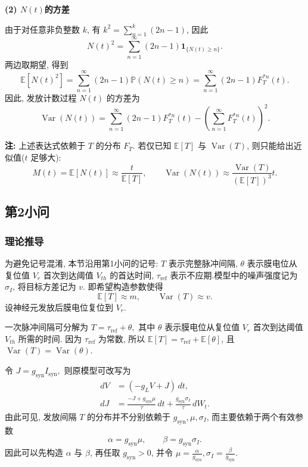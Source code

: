 ﻿\documentclass[UTF8,  zihao=-4]{ctexart}
\begin{document}
\textbf{(2) \(N(t)\)的方差}

由于对任意非负整数 \(k\), 有 \(k^2=\sum_{n=1}^{k}(2n-1)\), 因此
\[
N(t)^2
=
\sum_{n=1}^{\infty}(2n-1)\mathbf{1}_{\{N(t)\geq n\}}.
\]
两边取期望, 得到
\[
\mathbb{E}[N(t)^2]
=
\sum_{n=1}^{\infty}(2n-1)\mathbb{P}(N(t)\geq n)
=
\sum_{n=1}^{\infty}(2n-1)F_T^{*n}(t).
\]
因此, 发放计数过程 \(N(t)\) 的方差为
\[
\operatorname{Var}(N(t))
=
\sum_{n=1}^{\infty}(2n-1)F_T^{*n}(t)
-
\left(
\sum_{n=1}^{\infty}F_T^{*n}(t)
\right)^2.
\]

\textbf{注: }上述表达式依赖于 \(T\) 的分布 \(F_T\). 若仅已知 \(\mathbb{E}[T]\) 与 \(\operatorname{Var}(T)\), 则只能给出近似值(\(t\) 足够大):
\[
M(t)=\mathbb{E}[N(t)]\approx \frac{t}{\mathbb{E}[T]}
, 
\qquad
\operatorname{Var}(N(t))\approx \frac{\operatorname{Var}(T)}{(\mathbb{E}[T])^3}t
.
\]

\subsection{第2小问}
\subsubsection{理论推导}
为避免记号混淆,  本节沿用第1小问的记号: \(T\) 表示完整脉冲间隔,  \(\theta\) 表示膜电位从复位值 \(V_r\) 首次到达阈值 \(V_{th}\) 的首达时间,  \(\tau_{\mathrm{ref}}\) 表示不应期.模型中的噪声强度记为 \(\sigma_I\),  将目标方差记为 \(v\). 即希望构造参数使得
\[
    \mathbb E[T]\approx m, \qquad \operatorname{Var}(T)\approx v.
\]
设神经元发放后膜电位复位到 \(V_r\).

一次脉冲间隔可分解为
$
    T=\tau_{\mathrm{ref}}+\theta, 
$
其中 \(\theta\) 表示膜电位从复位值 \(V_r\) 首次到达阈值 \(V_{th}\) 所需的时间. 因为 \(\tau_{\mathrm{ref}}\) 为常数,  所以 \(\mathbb E[T]=\tau_{\mathrm{ref}}+\mathbb E[\theta]\),  且 \(\operatorname{Var}(T)=\operatorname{Var}(\theta)\).

令
$
    J=g_{\mathrm{syn}}I_{\mathrm{syn}}, 
$
则原模型可改写为
\begin{equation}
\begin{aligned}
    dV&=(-g_LV+J)\,  dt, \\
    dJ&=\frac{-J+g_{\mathrm{syn}}\mu}{\tau}\,  dt
    +\frac{g_{\mathrm{syn}}\sigma_I}{\tau}\,  dW_t.
\end{aligned}
\end{equation}
由此可见,  发放间隔 \(T\) 的分布并不分别依赖于 \(g_{\mathrm{syn}}, \mu, \sigma_I\),  而主要依赖于两个有效参数
\[
    \alpha=g_{\mathrm{syn}}\mu, \qquad 
    \beta=g_{\mathrm{syn}}\sigma_I.
\]
因此可以先构造 \(\alpha\) 与 \(\beta\),  再任取 \(g_{\mathrm{syn}}>0\),  并令
$
    \mu=\frac{\alpha}{g_{\mathrm{syn}}}, 
    \sigma_I=\frac{\beta}{g_{\mathrm{syn}}}.
$
\end{document}
